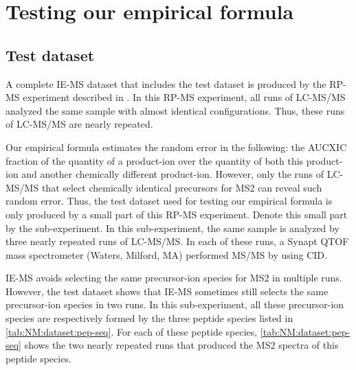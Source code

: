 \section{Testing our empirical formula}
\label{sec:error:evaluation}

\subsection{Test dataset}

A complete \gls{IE-MS} dataset that includes the test dataset is produced by the \gls{RP-MS} experiment described in \cite{vahidi2012mapping}.
In this \gls{RP-MS} experiment, all runs of \gls{LC-MS/MS} analyzed the same sample with almost identical configurations.
Thus, these runs of \gls{LC-MS/MS} are nearly repeated.

Our empirical formula estimates the random error in the following: 
	the \gls{AUCXIC} fraction of the quantity of a product-ion over the quantity of both this product-ion and another chemically different product-ion.
However, only the runs of \gls{LC-MS/MS} that select chemically identical precursors for \gls{MS2} can reveal such random error.
Thus,	the test dataset used for testing our empirical formula is only produced by a small part of this \gls{RP-MS} experiment.
Denote this small part by the sub-experiment.
In this sub-experiment, the same sample is analyzed by three nearly repeated runs of \gls{LC-MS/MS}.
In each of these runs, a Synapt \gls{QTOF} mass spectrometer (Waters, Milford, MA) performed \gls{MS/MS} by using \gls{CID}.

\Gls{IE-MS} avoids selecting the same precursor-ion species for \gls{MS2} in multiple runs.
However, the test dataset shows that \gls{IE-MS} sometimes still selects the same precursor-ion species in two runs.
In this sub-experiment, all these precursor-ion species are respectively formed by the three peptide species listed in \cref{tab:NM:dataset:pep-seq}.
For each of these peptide species, \cref{tab:NM:dataset:pep-seq} shows the two nearly repeated runs that produced the \gls{MS2} spectra of this peptide species.
	
